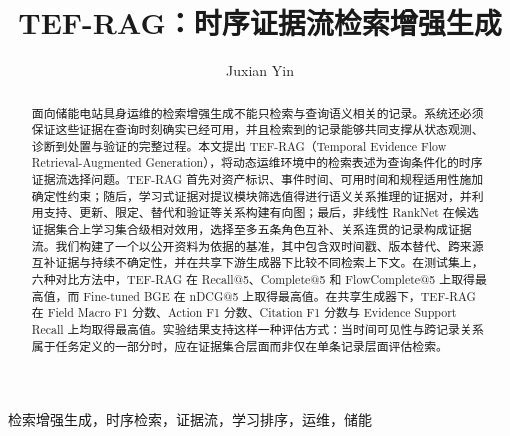 \documentclass[letterpaper,10pt,conference]{IEEEtran}
\title{TEF-RAG：时序证据流检索增强生成}
\author{Juxian Yin}
\begin{document}
\maketitle

\begin{abstract}
面向储能电站具身运维的检索增强生成不能只检索与查询语义相关的记录。系统还必须保证这些证据在查询时刻确实已经可用，并且检索到的记录能够共同支撑从状态观测、诊断到处置与验证的完整过程。本文提出 TEF-RAG（Temporal Evidence Flow Retrieval-Augmented Generation），将动态运维环境中的检索表述为查询条件化的时序证据流选择问题。TEF-RAG 首先对资产标识、事件时间、可用时间和规程适用性施加确定性约束；随后，学习式证据对提议模块筛选值得进行语义关系推理的证据对，并利用支持、更新、限定、替代和验证等关系构建有向图；最后，非线性 RankNet 在候选证据集合上学习集合级相对效用，选择至多五条角色互补、关系连贯的记录构成证据流。我们构建了一个以公开资料为依据的基准，其中包含双时间戳、版本替代、跨来源互补证据与持续不确定性，并在共享下游生成器下比较不同检索上下文。在测试集上，六种对比方法中，TEF-RAG 在 Recall@5、Complete@5 和 FlowComplete@5 上取得最高值，而 Fine-tuned BGE 在 nDCG@5 上取得最高值。在共享生成器下，TEF-RAG 在 Field Macro F1 分数、Action F1 分数、Citation F1 分数与 Evidence Support Recall 上均取得最高值。实验结果支持这样一种评估方式：当时间可见性与跨记录关系属于任务定义的一部分时，应在证据集合层面而非仅在单条记录层面评估检索。
\end{abstract}

\begin{IEEEkeywords}
检索增强生成，时序检索，证据流，学习排序，运维，储能
\end{IEEEkeywords}







\newpage
\appendices

\end{document}
